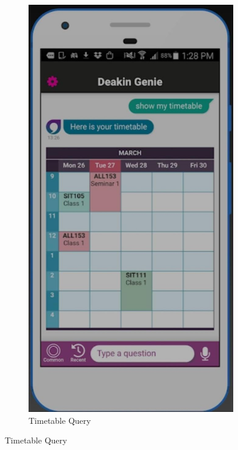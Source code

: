 \documentclass{l4proj}
\begin{document}
\begin{figure}[ht]
  \hfill %
  \begin{subfigure}[b]{0.22\textwidth}
    \includegraphics[width=\textwidth]{images/genie2.jpeg}
    \caption{Timetable Query}
  \end{subfigure}
\end{figure}
\end{document}
